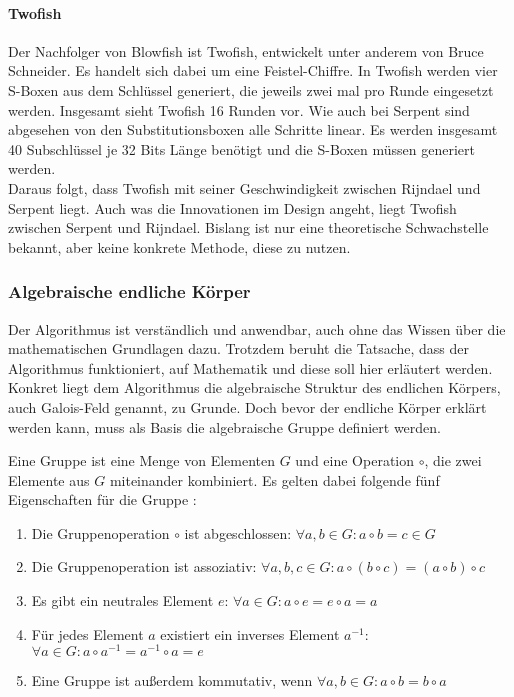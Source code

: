  \paragraph{Twofish}
 Der Nachfolger von Blowfish ist Twofish, entwickelt unter anderem von Bruce Schneider. Es handelt sich dabei um eine Feistel-Chiffre.
 In Twofish werden vier S-Boxen aus dem
 Schlüssel generiert, die jeweils zwei mal pro Runde eingesetzt werden. Insgesamt sieht Twofish 16 Runden vor.
 Wie auch bei Serpent sind abgesehen von den Substitutionsboxen alle Schritte linear. Es werden insgesamt 40
 Subschlüssel je 32 Bits Länge benötigt und die S-Boxen müssen generiert werden. \\
 Daraus folgt, dass Twofish mit seiner Geschwindigkeit zwischen Rijndael und Serpent liegt. Auch was die Innovationen
 im Design angeht, liegt Twofish zwischen Serpent und Rijndael. Bislang ist nur eine theoretische Schwachstelle
 bekannt, aber keine konkrete Methode, diese zu nutzen. \cite{schmeh07}
 
 \subsubsection[Algebraische endliche Körper (Heumann)]{Algebraische endliche Körper}
 Der Algorithmus ist verständlich und anwendbar, auch ohne das Wissen über die mathematischen
 Grundlagen dazu. Trotzdem beruht die Tatsache, dass der Algorithmus funktioniert, auf Mathematik
 und diese soll hier erläutert werden. Konkret liegt dem Algorithmus die algebraische Struktur des
 endlichen Körpers, auch Galois-Feld genannt, zu Grunde. Doch bevor der endliche Körper
 erklärt werden kann, muss als Basis die algebraische Gruppe definiert werden.
 
 Eine Gruppe ist eine Menge von Elementen $G$ und eine Operation $\circ$, die zwei Elemente
 aus $G$ miteinander kombiniert. Es gelten dabei folgende fünf Eigenschaften für die Gruppe \cite{paar10}:
 
 \begin{enumerate}
 	\item Die Gruppenoperation $\circ$ ist abgeschlossen: $\forall a, b \in G: a \circ b = c \in G$
	\item Die Gruppenoperation ist assoziativ: $\forall a, b, c \in G: a \circ (b \circ c) = (a \circ b) \circ c$
	\item Es gibt ein neutrales Element $e$: $\forall a \in G: a \circ e = e \circ a = a$
	\item Für jedes Element $a$ existiert ein inverses Element $a^{-1}$: $\forall a \in G: a \circ a^{-1} = a^{-1} \circ a = e$
	\item Eine Gruppe ist außerdem kommutativ, wenn $\forall a, b \in G: a\circ b = b \circ a$
 \end{enumerate}

